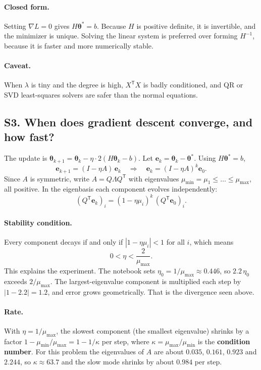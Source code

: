 \documentclass[11pt]{article}
\newcommand{\T}{\mathsf{T}}
\newcommand{\vth}{\bm{\theta}}
\newcommand{\grad}{\nabla}
\begin{document}
\paragraph{Closed form.} Setting $\grad L=0$ gives $H\vth^\ast=b$. Because $H$ is positive definite, it is invertible, and the minimizer is unique. Solving the linear system is preferred over forming $H^{-1}$, because it is faster and more numerically stable.

\paragraph{Caveat.} When $\lambda$ is tiny and the degree is high, $X^{\T}X$ is badly conditioned, and QR or SVD least-squares solvers are safer than the normal equations.

\label{sec:conv}
\subsection*{S3. When does gradient descent converge, and how fast?}
The update is $\vth_{k+1}=\vth_k-\eta\cdot2(H\vth_k-b)$. Let $\mathbf e_k=\vth_k-\vth^\ast$. Using $H\vth^\ast=b$,
\[
  \mathbf e_{k+1}=(I-\eta A)\,\mathbf e_k
  \quad\Longrightarrow\quad
  \mathbf e_k=(I-\eta A)^k\mathbf e_0 .
\]
Since $A$ is symmetric, write $A=Q\Lambda Q^{\T}$ with eigenvalues $\mu_{\min}=\mu_1\le\dots\le\mu_{\max}$, all positive. In the eigenbasis each component evolves independently:
\[
  (Q^{\T}\mathbf e_k)_i=(1-\eta\mu_i)^k\,(Q^{\T}\mathbf e_0)_i .
\]

\paragraph{Stability condition.} Every component decays if and only if $|1-\eta\mu_i|<1$ for all $i$, which means
\begin{equation}
  0<\eta<\frac{2}{\mu_{\max}} .
\end{equation}
This explains the experiment. The notebook sets $\eta_0=1/\mu_{\max}\approx0.446$, so $2.2\,\eta_0$ exceeds $2/\mu_{\max}$. The largest-eigenvalue component is multiplied each step by $|1-2.2|=1.2$, and error grows geometrically. That is the divergence seen above.

\paragraph{Rate.} With $\eta=1/\mu_{\max}$, the slowest component (the smallest eigenvalue) shrinks by a factor $1-\mu_{\min}/\mu_{\max}=1-1/\kappa$ per step, where $\kappa=\mu_{\max}/\mu_{\min}$ is the \textbf{condition number}. For this problem the eigenvalues of $A$ are about $0.035$, $0.161$, $0.923$ and $2.244$, so $\kappa\approx63.7$ and the slow mode shrinks by about $0.984$ per step.
\end{document}
